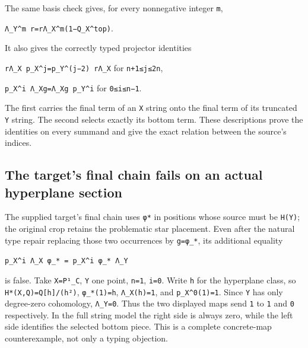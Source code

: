 \documentclass[
  10pt,
]{article}
\begin{document}
The same basis check gives, for every nonnegative integer
\texttt{\small m},

\texttt{\small Λ\_\allowbreak{}Y\textasciicircum{}m r=\allowbreak{}rΛ\_\allowbreak{}X\textasciicircum{}m(\allowbreak{}1−Q\_\allowbreak{}X\textasciicircum{}top)\allowbreak{}}.

It also gives the correctly typed projector identities

\texttt{\small rΛ\_\allowbreak{}X p\_\allowbreak{}X\textasciicircum{}j=\allowbreak{}p\_\allowbreak{}Y\textasciicircum{}(\allowbreak{}j−2)\allowbreak{} rΛ\_\allowbreak{}X}
for \texttt{\small n+\allowbreak{}1≤\allowbreak{}j≤\allowbreak{}2n},

\texttt{\small p\_\allowbreak{}X\textasciicircum{}i Λ\_\allowbreak{}Xg=\allowbreak{}Λ\_\allowbreak{}Xg p\_\allowbreak{}Y\textasciicircum{}i}
for \texttt{\small 0≤\allowbreak{}i≤\allowbreak{}n−1}.

The first carries the final term of an \texttt{\small X} string onto the
final term of its truncated \texttt{\small Y} string. The second selects
exactly its bottom term. These descriptions prove the identities on
every summand and give the exact relation between the source's indices.

\subsection{The target's final chain fails on an actual hyperplane
section}\label{the-targets-final-chain-fails-on-an-actual-hyperplane-section}

The supplied target's final chain uses \texttt{\small φ*} in positions
whose source must be \texttt{\small H(\allowbreak{}Y)\allowbreak{}}; the
original crop retains the problematic star placement. Even after the
natural type repair replacing those two occurrences by
\texttt{\small g=\allowbreak{}φ\_\allowbreak{}*}, its additional
equality

\texttt{\small p\_\allowbreak{}X\textasciicircum{}i Λ\_\allowbreak{}X φ\_\allowbreak{}* =\allowbreak{} p\_\allowbreak{}X\textasciicircum{}i φ\_\allowbreak{}* Λ\_\allowbreak{}Y}

is false. Take \texttt{\small X=\allowbreak{}P¹\_\allowbreak{}C},
\texttt{\small Y} one point, \texttt{\small n=\allowbreak{}1},
\texttt{\small i=\allowbreak{}0}. Write \texttt{\small h} for the
hyperplane class, so
\texttt{\small H*(\allowbreak{}X,\allowbreak{}Q)\allowbreak{}=\allowbreak{}Q[\allowbreak{}h]\allowbreak{}/\allowbreak{}(\allowbreak{}h²)\allowbreak{}},
\texttt{\small φ\_\allowbreak{}*(\allowbreak{}1)\allowbreak{}=\allowbreak{}h},
\texttt{\small Λ\_\allowbreak{}X(\allowbreak{}h)\allowbreak{}=\allowbreak{}1},
and
\texttt{\small p\_\allowbreak{}X\textasciicircum{}0(\allowbreak{}1)\allowbreak{}=\allowbreak{}1}.
Since \texttt{\small Y} has only degree-zero cohomology,
\texttt{\small Λ\_\allowbreak{}Y=\allowbreak{}0}. Thus the two displayed
maps send \texttt{\small 1} to \texttt{\small 1} and \texttt{\small 0}
respectively. In the full string model the right side is always zero,
while the left side identifies the selected bottom piece. This is a
complete concrete-map counterexample, not only a typing objection.
\end{document}

